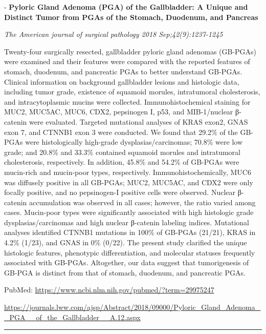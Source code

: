 \documentclass[]{article}
\begin{document}
 - \textbf{Pyloric Gland Adenoma (PGA) of the Gallbladder: A Unique and
Distinct Tumor from PGAs of the Stomach, Duodenum, and Pancreas}

\emph{The American journal of surgical pathology 2018
Sep;42(9):1237-1245}

Twenty-four surgically resected, gallbladder pyloric gland adenomas
(GB-PGAs) were examined and their features were compared with the
reported features of stomach, duodenum, and pancreatic PGAs to better
understand GB-PGAs. Clinical information on background gallbladder
lesions and histologic data, including tumor grade, existence of
squamoid morules, intratumoral cholesterosis, and intracytoplasmic
mucins were collected. Immunohistochemical staining for MUC2, MUC5AC,
MUC6, CDX2, pepsinogen I, p53, and MIB-1/nuclear β-catenin were
evaluated. Targeted mutational analyses of KRAS exon2, GNAS exon 7, and
CTNNB1 exon 3 were conducted. We found that 29.2\% of the GB-PGAs were
histologically high-grade dysplasias/carcinomas; 70.8\% were low grade;
and 20.8\% and 33.3\% contained squamoid morules and intratumoral
cholesterosis, respectively. In addition, 45.8\% and 54.2\% of GB-PGAs
were mucin-rich and mucin-poor types, respectively.
Immunohistochemically, MUC6 was diffusely positive in all GB-PGAs; MUC2,
MUC5AC, and CDX2 were only focally positive, and no pepsinogen-I
positive cells were observed. Nuclear β-catenin accumulation was
observed in all cases; however, the ratio varied among cases. Mucin-poor
types were significantly associated with high histologic grade
dysplasias/carcinomas and high nuclear β-catenin labeling indices.
Mutational analyses identified CTNNB1 mutations in 100\% of GB-PGAs
(21/21), KRAS in 4.2\% (1/23), and GNAS in 0\% (0/22). The present study
clarified the unique histologic features, phenotypic differentiation,
and molecular statuses frequently associated with GB-PGAs. Altogether,
our data suggest that tumorigenesis of GB-PGA is distinct from that of
stomach, duodenum, and pancreatic PGAs.

PubMed: \url{https://www.ncbi.nlm.nih.gov/pubmed/?term=29975247}

\url{https://journals.lww.com/ajsp/Abstract/2018/09000/Pyloric_Gland_Adenoma__PGA__of_the_Gallbladder__A.12.aspx}

{}

{}

\begin{center}\rule{0.5\linewidth}{\linethickness}\end{center}
\end{document}
